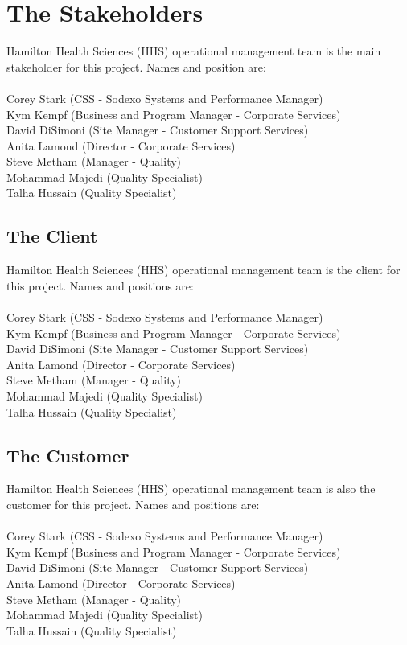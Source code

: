 \documentclass[paper=letter, fontsize=10pt]{scrartcl}
\numberwithin{equation}{section}		%
\numberwithin{figure}{section}			%
\numberwithin{table}{section}				%
\begin{document}
\section{The Stakeholders}
Hamilton Health Sciences (HHS) operational management team is the main stakeholder for this project. Names and position are:\\ \\
Corey Stark (CSS - Sodexo Systems and Performance Manager)\\
Kym Kempf (Business and Program Manager - Corporate Services)\\
David DiSimoni (Site Manager - Customer Support Services)\\
Anita Lamond (Director - Corporate Services)\\
Steve Metham (Manager - Quality)\\
Mohammad Majedi (Quality Specialist)\\
Talha Hussain (Quality Specialist)

\subsection{The Client}
Hamilton Health Sciences (HHS) operational management team is the client for this project. Names and positions are:\\ \\
Corey Stark (CSS - Sodexo Systems and Performance Manager)\\
Kym Kempf (Business and Program Manager - Corporate Services)\\
David DiSimoni (Site Manager - Customer Support Services)\\
Anita Lamond (Director - Corporate Services)\\
Steve Metham (Manager - Quality)\\
Mohammad Majedi (Quality Specialist)\\
Talha Hussain (Quality Specialist)

\subsection{The Customer}
Hamilton Health Sciences (HHS) operational management team is also the customer for this project. Names and positions are:\\ \\
Corey Stark (CSS - Sodexo Systems and Performance Manager)\\
Kym Kempf (Business and Program Manager - Corporate Services)\\
David DiSimoni (Site Manager - Customer Support Services)\\
Anita Lamond (Director - Corporate Services)\\
Steve Metham (Manager - Quality)\\
Mohammad Majedi (Quality Specialist)\\
Talha Hussain (Quality Specialist)
\end{document}
